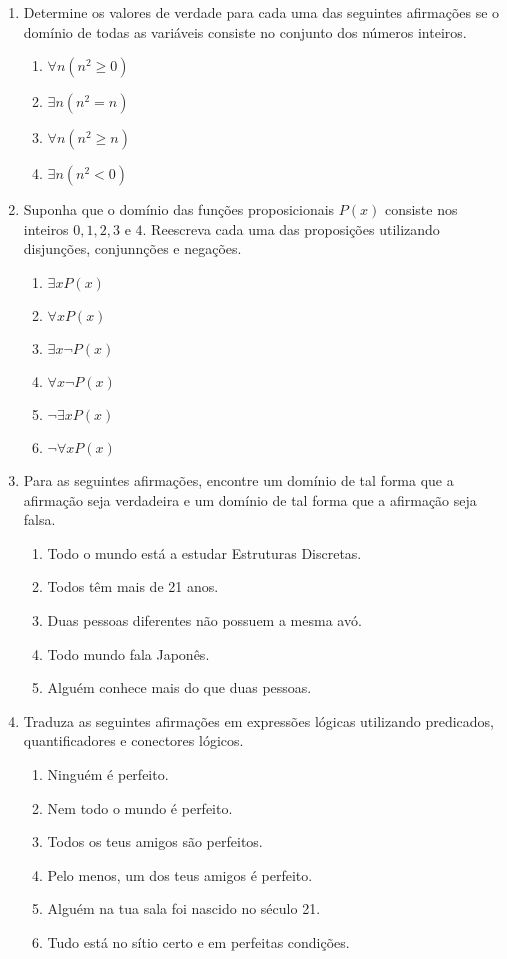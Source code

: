 \begin{enumerate}
	\item Determine os valores de verdade para cada uma das seguintes afirmações se o domínio de todas as variáveis consiste
	no conjunto dos números inteiros.
	\begin{enumerate}
		\item $\forall n(n^2 \geq 0)$ \item $\exists n (n^2 = n)$ \item $\forall n(n^2 \geq n)$ \item $\exists n(n^2 < 0)$
	\end{enumerate}
	
	\item Suponha que o domínio das funções proposicionais $P(x)$ consiste nos inteiros $0, 1, 2, 3$ e $4$. Reescreva cada uma
	das proposições utilizando disjunções, conjunnções e negações.
	\begin{enumerate}
		\item $\exists xP(x)$ \item $\forall xP(x)$ \item $\exists x \lnot P(x)$ \item $\forall x \lnot P(x)$
		\item $\lnot \exists xP(x)$ \item $\lnot \forall x P(x)$
	\end{enumerate}
	
	\item Para as seguintes afirmações, encontre um domínio de tal forma que a afirmação seja verdadeira e um domínio de tal forma
	que a afirmação seja falsa.
	\begin{enumerate}
		\item Todo o mundo está a estudar Estruturas Discretas.
		\item Todos têm mais de 21 anos.
		\item Duas pessoas diferentes não possuem a mesma avó.
		\item Todo mundo fala Japonês.
		\item Alguém conhece mais do que duas pessoas.
	\end{enumerate}
	
	\item Traduza as seguintes afirmações em expressões lógicas utilizando predicados, quantificadores e conectores lógicos.
	\begin{enumerate}
	  \item Ninguém é perfeito.
	  \item Nem todo o mundo é perfeito.
	  \item Todos os teus amigos são perfeitos.
	  \item Pelo menos, um dos teus amigos é perfeito.
	  \item Alguém na tua sala foi nascido no século 21.
	  \item Tudo está no sítio certo e em perfeitas condições.
	\end{enumerate}
	

\end{enumerate}
